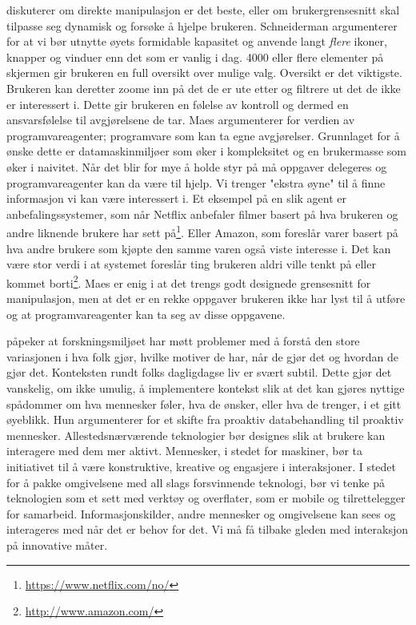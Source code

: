 \citet{directmanipulation} diskuterer om direkte manipulasjon er det beste, eller om brukergrensesnitt skal tilpasse seg dynamisk og forsøke å hjelpe brukeren. Schneiderman argumenterer for at vi bør utnytte øyets formidable kapasitet og anvende langt \emph{flere} ikoner, knapper og vinduer enn det som er vanlig i dag. 4000 eller flere elementer på skjermen gir brukeren en full oversikt over mulige valg. Oversikt er det viktigste. Brukeren kan deretter zoome inn på det de er ute etter og filtrere ut det de ikke er interessert i. Dette gir brukeren en følelse av kontroll og dermed en ansvarsfølelse til avgjørelsene de tar. Maes argumenterer for verdien av programvareagenter; programvare som kan ta egne avgjørelser. Grunnlaget for å ønske dette er datamaskinmiljøer som øker i kompleksitet og en brukermasse som øker i naivitet. Når det blir for mye å holde styr på må oppgaver delegeres og programvareagenter kan da være til hjelp. Vi trenger "ekstra øyne" til å finne informasjon vi kan være interessert i. Et eksempel på en slik agent er anbefalingssystemer, som når Netflix anbefaler filmer basert på hva brukeren og andre liknende brukere har sett på\footnote{\url{https://www.netflix.com/no/}}. Eller Amazon, som foreslår varer basert på hva andre brukere som kjøpte den samme varen også viste interesse i. Det kan være stor verdi i at systemet foreslår ting brukeren aldri ville tenkt på eller kommet borti\footnote{\url{http://www.amazon.com/}}. Maes er enig i at det trengs godt designede grensesnitt for manipulasjon, men at det er en rekke oppgaver brukeren ikke har lyst til å utføre og at programvareagenter kan ta seg av disse oppgavene.

\citet{rogers06} påpeker at forskningsmiljøet har møtt problemer med å forstå den store variasjonen i hva folk gjør, hvilke motiver de har, når de gjør det og hvordan de gjør det. Konteksten rundt folks dagligdagse liv er svært subtil. Dette gjør det vanskelig, om ikke umulig, å implementere kontekst slik at det kan gjøres nyttige spådommer om hva mennesker føler, hva de ønsker, eller hva de trenger, i et gitt øyeblikk. Hun argumenterer for et skifte fra proaktiv databehandling til proaktiv mennesker. Allestedsnærværende teknologier bør designes slik at brukere kan interagere med dem mer aktivt. Mennesker, i stedet for maskiner, bør ta initiativet til å være konstruktive, kreative og engasjere i interaksjoner. I stedet for å pakke omgivelsene med all slags forsvinnende teknologi, bør vi tenke på teknologien som et sett med verktøy og overflater, som er mobile og tilrettelegger for samarbeid. Informasjonskilder, andre mennesker og omgivelsene kan sees og interageres med når det er behov for det. Vi må få tilbake gleden med interaksjon på innovative måter.

